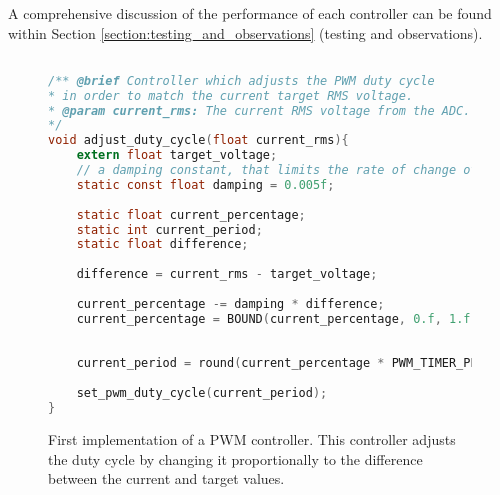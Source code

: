 A comprehensive discussion of the performance of each controller can be found within Section \ref{section:testing_and_observations} (testing and observations).

\begin{figure}[h]
\begin{lstlisting}[language=C, basicstyle=\small, tabsize=2]

/** @brief Controller which adjusts the PWM duty cycle
* in order to match the current target RMS voltage.
* @param current_rms: The current RMS voltage from the ADC.
*/
void adjust_duty_cycle(float current_rms){ 
	extern float target_voltage;
	// a damping constant, that limits the rate of change of the percentage.
	static const float damping = 0.005f;
	
	static float current_percentage;
	static int current_period;
	static float difference;
	
	difference = current_rms - target_voltage;
	
	current_percentage -= damping * difference;
	current_percentage = BOUND(current_percentage, 0.f, 1.f);
	
	
	current_period = round(current_percentage * PWM_TIMER_PERIOD);
	
	set_pwm_duty_cycle(current_period);
}
\end{lstlisting}
\caption{\label{fig:pwm_controller_1_logic} First implementation of a PWM controller. This controller adjusts the duty cycle by changing it proportionally to the difference between the current and target values.}
\end{figure}

